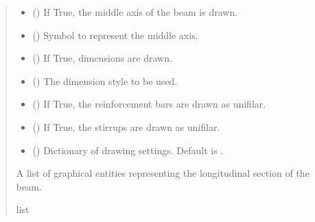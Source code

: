 \documentclass[a4paper,10pt,english]{sphinxmanual}
\begin{document}
\begin{fulllineitems}
\begin{fulllineitems}
\begin{quote}
\begin{description}
\begin{itemize}
\item {} 
\sphinxAtStartPar
{} () \textendash{} If True, the middle axis of the beam is drawn.

\item {} 
\sphinxAtStartPar
{} () \textendash{} Symbol to represent the middle axis.

\item {} 
\sphinxAtStartPar
{} () \textendash{} If True, dimensions are drawn.

\item {} 
\sphinxAtStartPar
{} () \textendash{} The dimension style to be used.

\item {} 
\sphinxAtStartPar
{} () \textendash{} If True, the reinforcement bars are drawn as unifilar.

\item {} 
\sphinxAtStartPar
{} () \textendash{} If True, the stirrups are drawn as unifilar.

\item {} 
\sphinxAtStartPar
{} () \textendash{} Dictionary of drawing settings. Default is .

\end{itemize}

\sphinxAtStartPar
A list of graphical entities representing the longitudinal section of the beam.

\sphinxAtStartPar
list

\end{description}\end{quote}

\end{fulllineitems}



\end{fulllineitems}
\end{document}

